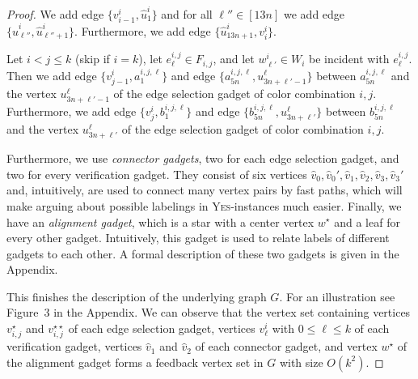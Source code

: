 \documentclass[a4paper,UKenglish,cleveref, autoref, thm-restate, anonymous]{lipics-v2021}
\begin{document}
\begin{proof}
    We add edge $\{v^i_{i-1},\hat{u}^i_1\}$ and for all $\ell''\in[13n]$ we add edge $\{\hat{u}^i_{\ell''},\hat{u}^i_{\ell''+1}\}$. Furthermore, we add edge $\{\hat{u}^i_{13n+1},v^i_i\}$. 

    Let $i<j\le k$ (skip if $i=k$), let $e_\ell^{i,j}\in F_{i,j}$, and let $w^i_{\ell'}\in W_i$ be incident with $e_\ell^{i,j}$. Then we add edge $\{v_{j-1}^i,a^{i,j,\ell}_{1}\}$ and edge $\{a^{i,j,\ell}_{5n},u^\ell_{3n+\ell'-1}\}$ between $a^{i,j,\ell}_{5n}$ and the vertex $u^\ell_{3n+\ell'-1}$ of the edge selection gadget of color combination $i,j$.
    Furthermore, we add edge $\{v_{j}^i,b^{i,j,\ell}_{1}\}$ and edge $\{b^{i,j,\ell}_{5n},u^\ell_{3n+\ell'}\}$ between $b^{i,j,\ell}_{5n}$ and the vertex $u^\ell_{3n+\ell'}$ of the edge selection gadget of color combination $i,j$.




Furthermore, we use \emph{connector gadgets}, two for each edge selection gadget, and two for every verification gadget. They consist of six vertices $\hat{v}_0,\hat{v}_0',\hat{v}_1,\hat{v}_2,\hat{v}_3,\hat{v}_3'$ and, intuitively, are used to connect many vertex pairs by fast paths, which will make arguing about possible labelings in \textsc{Yes}-instances much easier. Finally, we have an \emph{alignment gadget}, which is a star with a center vertex $w^\star$ and a leaf for every other gadget. Intuitively, this gadget is used to relate labels of different gadgets to each other. A formal description of these two gadgets is given in the Appendix.

This finishes the description of the underlying graph $G$. For an illustration see Figure~3 in the Appendix. We can observe that the vertex set containing
    vertices $v_{i,j}^\star$ and $v_{i,j}^{\star\star}$ of each edge selection gadget,
    vertices $v^i_\ell$ with $0\le \ell\le k$ of each verification gadget,
    vertices $\hat{v}_1$ and $\hat{v}_2$ of each connector gadget, and
    vertex $w^\star$ of the alignment gadget
forms a feedback vertex set in $G$ with size $O(k^2)$.


\end{proof}
\end{document}
